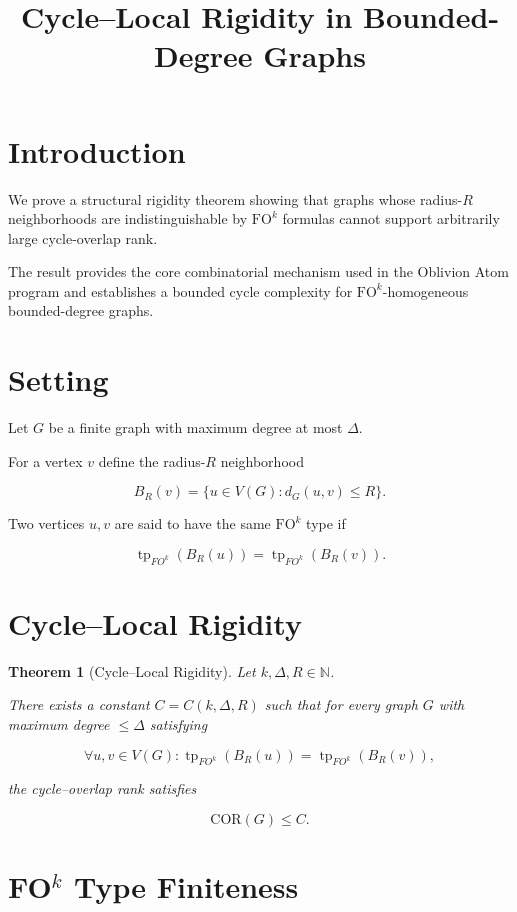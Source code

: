 \documentclass[11pt]{article}
\title{Cycle--Local Rigidity in Bounded-Degree Graphs}
\author{}
\date{}
\newtheorem{theorem}{Theorem}
\begin{document}
\maketitle

\section{Introduction}

We prove a structural rigidity theorem showing that graphs whose
radius-$R$ neighborhoods are indistinguishable by $\mathrm{FO}^k$
formulas cannot support arbitrarily large cycle-overlap rank.

The result provides the core combinatorial mechanism used in the
Oblivion Atom program and establishes a bounded cycle complexity
for $\mathrm{FO}^k$-homogeneous bounded-degree graphs.

\section{Setting}

Let $G$ be a finite graph with maximum degree at most $\Delta$.

For a vertex $v$ define the radius-$R$ neighborhood

\[
B_R(v)=\{u\in V(G): d_G(u,v)\le R\}.
\]

Two vertices $u,v$ are said to have the same $\mathrm{FO}^k$ type if

\[
\operatorname{tp}_{FO^k}(B_R(u))
=
\operatorname{tp}_{FO^k}(B_R(v)).
\]

\section{Cycle--Local Rigidity}

\begin{theorem}[Cycle--Local Rigidity]
Let $k,\Delta,R\in\mathbb N$.

There exists a constant $C=C(k,\Delta,R)$ such that for every graph
$G$ with maximum degree $\le\Delta$ satisfying

\[
\forall u,v\in V(G):
\operatorname{tp}_{FO^k}(B_R(u))
=
\operatorname{tp}_{FO^k}(B_R(v)),
\]

the cycle--overlap rank satisfies

\[
\mathrm{COR}(G)\le C.
\]

\end{theorem}

\section{FO$^k$ Type Finiteness}
\end{document}
